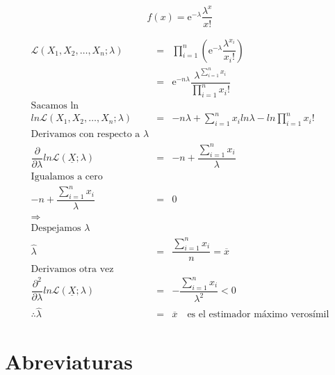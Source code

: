 \begin{appendices}
\begin{defn}
\begin{equation}
f(x) = \mathrm{e}^{-\lambda} \dfrac{\lambda^{x}}{x!}
\end{equation}

\begin{eqnarray*}
\mathcal{L}(X_{1}, X_{2},\ldots, X_{n}; \lambda) &=& \displaystyle \prod_{i = 1}^{n} \left( \mathrm{e}^{-\lambda} \dfrac{\lambda^{x_{i}}}{x_{i}!} \right)\\
												 &=& \mathrm{e}^{-n \lambda} \dfrac{\lambda^{\displaystyle \sum_{i = 1}^{n} x_{i}}}{\displaystyle  \prod_{i = 1}^{n} x_{i}!}\\
\text{Sacamos ln}\\
ln \mathcal{L}(X_{1}, X_{2}, \ldots, X_{n};\lambda) &=& -n\lambda + \displaystyle \sum_{i = 1}^{n} x_{i} ln \lambda - ln \displaystyle  \prod_{i = 1}^{n} x_{i}! \\
\text{Derivamos con respecto a } \lambda\\
\dfrac{\partial}{\partial \lambda} ln \mathcal{L}(\underline{X};\lambda) &=& -n + \dfrac{\displaystyle \sum_{i = 1}^{n} x_{i}}{\lambda} \\
\text{Igualamos a cero}\\
-n + \dfrac{\displaystyle \sum_{i = 1}^{n} x_{i}}{\lambda} &=& 0 \\
\Rightarrow\\
\text{Despejamos } \lambda\\
\hat{\lambda} &=& \dfrac{\displaystyle \sum_{i = 1}^{n} x_{i}}{n} = \overline{x}\\
\text{Derivamos otra vez}\\
\dfrac{\partial^{2}}{\partial \lambda} ln \mathcal{L}(\underline{X};\lambda)  &=& - \dfrac{\displaystyle \sum_{i = 1}^{n} x_{i}}{\lambda^{2}} < 0\\
\therefore \hat{\lambda} &=& \overline{x} \,\,\,\,\,\, \text{es el estimador máximo verosímil}
\end{eqnarray*}
\end{defn}






\chapter{Abreviaturas} %


\end{appendices}
